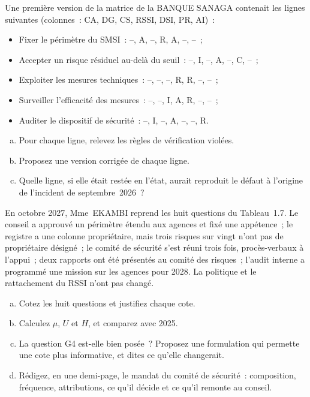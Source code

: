 \begin{boxexo}[title={\ding{45}\quad Exercice~1.3. Corriger une matrice RACI \niveaumoyen}]
Une première version de la matrice de la BANQUE SANAGA contenait les lignes
suivantes (colonnes~: CA, DG, CS, RSSI, DSI, PR, AI)~:
\begin{itemize}
    \item Fixer le périmètre du SMSI~: --, A, --, R, A, --, --~;
    \item Accepter un risque résiduel au-delà du seuil~: --, I, --, A, --,
          C, --~;
    \item Exploiter les mesures techniques~: --, --, --, R, R, --, --~;
    \item Surveiller l'efficacité des mesures~: --, --, I, A, R, --, --~;
    \item Auditer le dispositif de sécurité~: --, I, --, A, --, --, R.
\end{itemize}
\begin{enumerate}[(a)]
    \item Pour chaque ligne, relevez les règles de vérification violées.
    \item Proposez une version corrigée de chaque ligne.
    \item Quelle ligne, si elle était restée en l'état, aurait reproduit le
          défaut à l'origine de l'incident de septembre~2026~?
\end{enumerate}
\end{boxexo}

\begin{boxexo}[title={\ding{45}\quad Exercice~1.4. Un an après \niveauexpert}]
En octobre 2027, Mme~EKAMBI reprend les huit questions du Tableau~1.7. Le
conseil a approuvé un périmètre étendu aux agences et fixé une appétence~;
le registre a une colonne propriétaire, mais trois risques sur
vingt n'ont pas de propriétaire désigné~; le comité de sécurité s'est
réuni trois fois, procès-verbaux à l'appui~; deux rapports ont été
présentés au comité des risques~; l'audit interne a programmé une mission
sur les agences pour 2028. La politique et le rattachement du RSSI n'ont
pas changé.
\begin{enumerate}[(a)]
    \item Cotez les huit questions et justifiez chaque cote.
    \item Calculez $\mu$, $U$ et $H$, et comparez avec 2025.
    \item La question G4 est-elle bien posée~? Proposez une formulation qui
          permette une cote plus informative, et dites ce qu'elle changerait.
    \item Rédigez, en une demi-page, le mandat du comité de sécurité~:
          composition, fréquence, attributions, ce qu'il décide et ce qu'il
          remonte au conseil.
\end{enumerate}
\end{boxexo}

